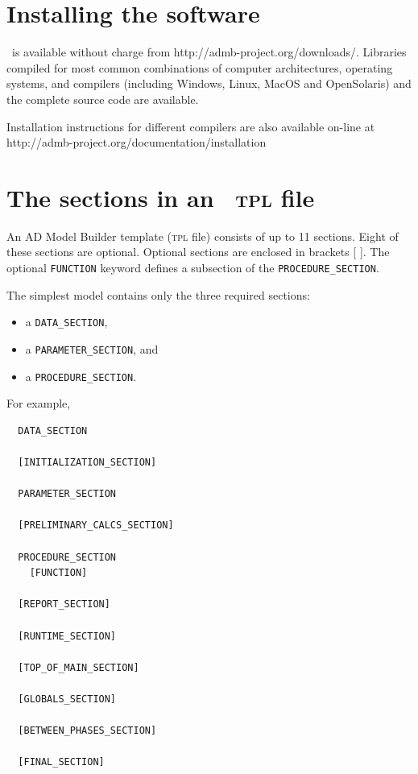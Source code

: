 \documentclass{admbmanual}
\newcommand\DS{\texttt{DATA\_SECTION}}
\newcommand\PS{\texttt{PARAMETER\_SECTION}}
\newcommand\PROS{\texttt{PROCEDURE\_SECTION}}
\begin{document}
\section{Installing the software}

\ADM\ is available without charge from
http://admb-project.org/downloads/.
Libraries compiled 
for most common combinations of computer 
architectures, operating systems, and compilers (including Windows,
Linux, MacOS and OpenSolaris) and the complete source code are
available.

Installation instructions for different compilers are also available on-line at\\
http://admb-project.org/documentation/installation

\section{The sections in an \ADMS\ \textsc{tpl} file}

An AD Model Builder template (\textsc{tpl} file) consists of up to 11 sections.
Eight of these sections are optional. Optional sections are 
enclosed in brackets [ ]. The optional \texttt{FUNCTION} keyword defines a 
subsection of the \PROS.

The simplest model contains only the three required sections:
\begin{itemize}
  \item a \DS,
  \item a \PS, and 
  \item a \PROS.
\end{itemize}
 
For example,
\begin{lstlisting}
  DATA_SECTION
  
  [INITIALIZATION_SECTION]
  
  PARAMETER_SECTION

  [PRELIMINARY_CALCS_SECTION]

  PROCEDURE_SECTION
    [FUNCTION]
  
  [REPORT_SECTION]

  [RUNTIME_SECTION]

  [TOP_OF_MAIN_SECTION]

  [GLOBALS_SECTION]

  [BETWEEN_PHASES_SECTION]

  [FINAL_SECTION]
\end{lstlisting}
\end{document}

